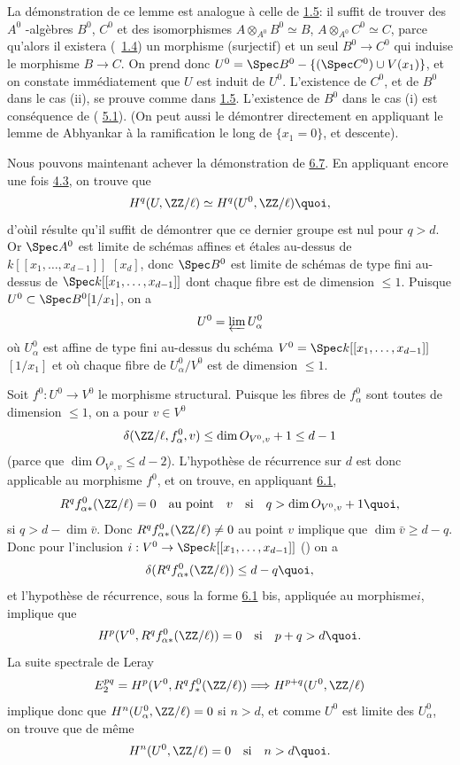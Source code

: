 \documentclass[10pt]{../fichiers-configuration-latex/smfart}
\begin{document}
La démonstration de ce lemme est analogue à celle de \hyperref[XIX.lem1.5]{1.5}:
il suffit de trouver des $A^{0}$ -algèbres $B^{0}$, $C^{0}$ et des
isomorphismes $A\otimes_{A^{0}}B^{0}\simeq B$,
$A\otimes_{A^{0}}C^{0}\simeq C$, parce qu'alors il existera
(\cite{3}~\hyperref[XIX.subsec1.4]{1.4}) un morphisme (surjectif) et un seul
$B^{0}\rightarrow C^{0}$ qui induise le morphisme $B\rightarrow C$. On
prend donc $U^{0}=\Spec B^{0}-\{(\Spec C^{0})\cup V(x_{1})\}$, et on
constate immédiatement que $U$ est induit de $U^{0}$. L'existence de
$C^{0}$, et de $B^{0}$ dans le cas (ii), se prouve comme dans
\hyperref[XIX.lem1.5]{1.5}. L'existence de $B^{0}$ dans le cas (i) est
conséquence de (\cite{3} 
\hyperref[XIX.thm5.1]{5.1}). (On peut aussi le démontrer directement en
appliquant le lemme 
de Abhyankar à la ramification le long de $\{x_{1}=0\}$, et descente).

Nous pouvons maintenant achever la démonstration de
\hyperref[XIX.lem6.7]{6.7}. En appliquant 
encore une fois \hyperref[XIX.cor4.3]{4.3}, on trouve que
$$
H^{q}(U,\ZZ/\ell)\simeq H^{q}(U^{0},\ZZ/\ell){\quoi},
$$
d'où\pageoriginale il résulte qu'il suffit de démontrer que ce dernier
groupe est nul pour $q>d$. Or $\Spec A^{0}$ est limite de schémas
affines et étales au-dessus de $k[[x_{1},\ldots,x_{d-1}]]$ $[x_{d}]$,
donc $\Spec B^{0}$ est limite de schémas de type fini au-dessus de
$\Spec k[[x_{1},\ldots,x_{d-1}]]$ dont chaque fibre est de dimension
$\leq 1$. Puisque $U^{0}\subset \Spec B^{0}[1/x_{1}]$, on a
$$
U^{0}=\varprojlim U^{0}_{\alpha}
$$
où $U^{0}_{\alpha}$ est affine de type fini au-dessus du schéma
$V^{0}=\Spec k[[x_{1},\ldots, x_{d-1}]]$ $[1/x_{1}]$ et où chaque
fibre de $U^{0}_{\alpha}/V^{0}$ est de dimension $\leq 1$.

Soit $f^{0}:U^{0}\rightarrow V^{0}$ le morphisme structural. Puisque
les fibres de $f^{0}_{\alpha}$ sont toutes de dimension $\leq 1$, on a
pour $v\in V^{0}$
$$
\delta(\ZZ/\ell, f^{0}_{\alpha},v)\leq \dim O_{V^{0},v}+1\leq
d-1
$$
(parce que $\dim O_{V^{0},v}\leq d-2$). L'hypothèse de récurrence sur
$d$ est donc applicable au morphisme $f^{0}$, et on trouve, en
appliquant \hyperref[XIX.thm6.1]{6.1},
$$
R^{q}f^{0}_{\alpha\ast}(\ZZ/\ell)=0\quad\text{\rm au
point}\quad v\quad\text{\rm si}\quad q>\dim O_{V^{0},v}+1{\quoi},
$$
\ie si $q>d-\dim\bar{v}$. Donc $R^{q}f^{0}_{\alpha
\ast}(\ZZ/\ell)\neq 0$ au point $v$ implique que $\dim
\bar{v}\geq d-q$. Donc pour l'inclusion $i:V^{0}\rightarrow \Spec
k[[x_{1},\ldots, x_{d-1}]]$ (\cf {}) on a
$$
\delta (R^{q}f^{0}_{\alpha\ast}(\ZZ/\ell))\leq d-q{\quoi},
$$
et l'hypothèse de récurrence, sous la forme \hyperref[XIX.thm6.1]{6.1} bis, appliquée au
morphisme\pageoriginale $i$, implique que
$$
H^{p}(V^{0},R^{q}f^{0}_{\alpha\ast}(\ZZ/\ell))=0\quad\text{\rm
si}\quad p+q>d{\quoi}.
$$
La suite spectrale de Leray
$$
E^{pq}_{2}=H^{p}(V^{0},R^{q}f^{0}_{\ast}(\ZZ/\ell))\Longrightarrow
H^{p+q}(U^{0},\ZZ/\ell)
$$
implique donc que $H^{n}(U^{0}_{\alpha},\ZZ/\ell)=0$ si $n>d$,
et comme $U^{0}$ est limite des $U^{0}_{\alpha}$, on trouve que de
même
$$
H^{n}(U^{0},\ZZ/\ell)=0\quad\text{\rm si}\quad n>d{\quoi}.
$$
\end{document}

